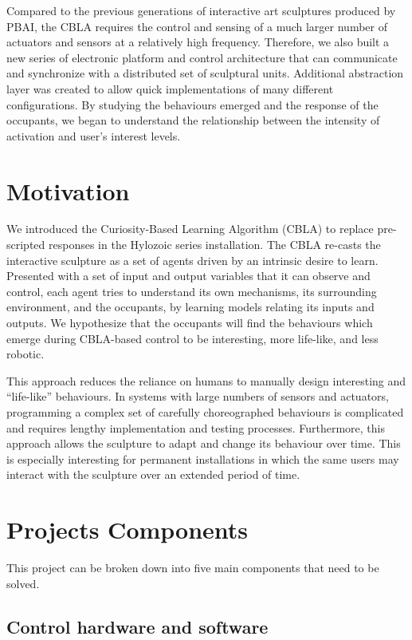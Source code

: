 Compared to the previous generations of interactive art sculptures produced by PBAI, the CBLA requires the control and sensing of a much larger number of actuators and sensors at a relatively high frequency. Therefore, we also built a new series of electronic platform and control architecture that can communicate and synchronize with a distributed set of sculptural units. Additional abstraction layer was created to allow quick implementations of many different configurations. By studying the behaviours emerged and the response of the occupants, we began to understand the relationship between the intensity of activation and user's interest levels. 


\section{Motivation}\label{sec:motivations}

We introduced the Curiosity-Based Learning Algorithm (CBLA) to replace pre-scripted responses in the Hylozoic series installation.  The CBLA re-casts the interactive sculpture as a set of agents driven by an intrinsic desire to learn.  Presented with a set of input and output variables that it can observe and control, each agent tries to understand its own mechanisms, its surrounding environment, and the occupants, by learning models relating its inputs and outputs. We hypothesize that the occupants will find the behaviours which emerge during CBLA-based control to be interesting, more life-like, and less robotic. 

This approach reduces the reliance on humans to manually design interesting and “life-like” behaviours. In systems with large numbers of sensors and actuators, programming a complex set of carefully choreographed behaviours is complicated and requires lengthy implementation and testing processes. Furthermore, this approach allows the sculpture to adapt and change its behaviour over time. This is especially interesting for permanent installations in which the same users may interact with the sculpture over an extended period of time. 


\section{Projects Components}

This project can be broken down into five main components that need to be solved.

\subsection{Control hardware and software}

